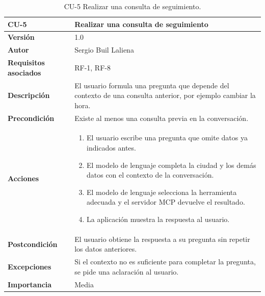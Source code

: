 \begin{table}[p]
	\centering
	\begin{tabularx}{\linewidth}{ p{} p{} }
		\toprule
		\textbf{CU-5}    & \textbf{Realizar una consulta de seguimiento}\\
		\toprule
		\textbf{Versión}              & 1.0    \\
		\textbf{Autor}                & Sergio Buil Laliena \\
		\textbf{Requisitos asociados} & RF-1, RF-8 \\
		\textbf{Descripción}          & El usuario formula una pregunta que depende del contexto de una consulta anterior, por ejemplo cambiar la hora. \\
		\textbf{Precondición}         & Existe al menos una consulta previa en la conversación. \\
		\textbf{Acciones}             &
		\begin{enumerate}
			\def\labelenumi{\arabic{enumi}.}
			\tightlist
			\item El usuario escribe una pregunta que omite datos ya indicados antes.
			\item El modelo de lenguaje completa la ciudad y los demás datos con el contexto de la conversación.
			\item El modelo de lenguaje selecciona la herramienta adecuada y el servidor MCP devuelve el resultado.
			\item La aplicación muestra la respuesta al usuario.
		\end{enumerate}\\
		\textbf{Postcondición}        & El usuario obtiene la respuesta a su pregunta sin repetir los datos anteriores. \\
		\textbf{Excepciones}          & Si el contexto no es suficiente para completar la pregunta, se pide una aclaración al usuario. \\
		\textbf{Importancia}          & Media \\
		\bottomrule
	\end{tabularx}
	\caption{CU-5 Realizar una consulta de seguimiento.}
	\label{tabla:cu5}
\end{table}